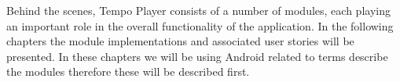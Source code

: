 Behind the scenes, Tempo Player consists of a number of modules, each playing an important role in the overall functionality of the application. In the following chapters the module implementations and associated user stories will be presented. In these chapters we will be using Android related to terms describe the modules therefore these will be described first. %
